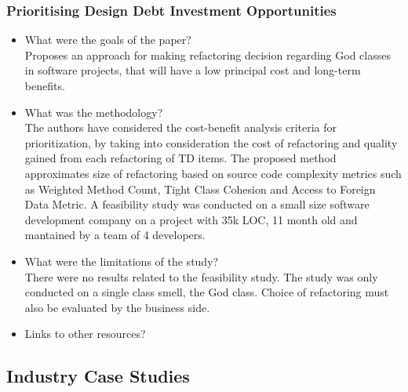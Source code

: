 \documentclass{mprop}
\begin{document}
\subsubsection{Prioritising Design Debt Investment Opportunities} \cite{Zazworka2011}
\begin{itemize}
\item What were the goals of the paper? \\
Proposes an approach for making refactoring decision regarding God classes in software projects, that will have a low principal cost and long-term benefits.
\item What was the methodology? \\
The authors have considered the cost-benefit analysis criteria for prioritization, by taking into consideration the cost of refactoring and quality gained from each refactoring of TD items.
The proposed method approximates size of refactoring based on source code complexity metrics such as Weighted Method Count, Tight Class Cohesion and Access to Foreign Data Metric.
A feasibility study was conducted on a small size software development company on a project with 35k LOC, 11 month old and mantained by a team of 4 developers.
\item What were the limitations of the study? \\
There were no results related to the feasibility study.
The study was only conducted on a single class smell, the God class. 
Choice of refactoring must also be evaluated by the business side. 
\item Links to other resources? \\
\end{itemize}

\subsection{Industry Case Studies}
\end{document}
